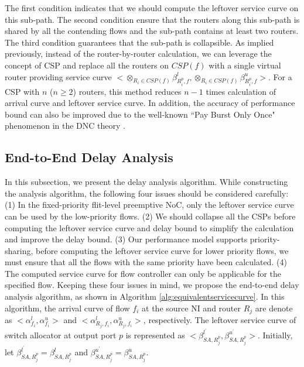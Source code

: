 \documentclass[10pt,journal]{IEEEtran}
\begin{document}
The first condition indicates that we should compute the leftover service curve on this sub-path. The second condition ensure that the routers along this sub-path is shared by all the contending flows and the sub-path contains at least two routers. The third condition guarantees that the sub-path is collapsible. As implied previously, instead of the router-by-router calculation, we can leverage the concept of CSP and replace all the routers on $CSP(f)$ with a single virtual router providing service curve $<\otimes_{R_i\in CSP(f)}\beta_{R_i^{p},f}^l,\otimes_{R_i\in CSP(f)}\beta_{R_i^{p},f}^u>$. For a CSP with $n$ ($n\geq 2$) routers, this method reduces $n-1$ times calculation of arrival curve and leftover service curve. In addition, the accuracy of performance bound can also be improved due to the well-known ``Pay Burst Only Once" phenomenon in the DNC theory \cite{Boudec2001Network}.

\subsection{End-to-End Delay Analysis}\label{e2elatency}
In this subsection, we present the delay analysis algorithm. While constructing the analysis algorithm, the following four issues should be considered carefully: (1) In the fixed-priority flit-level preemptive NoC, only the leftover service curve can be used by the low-priority flows. (2) We should collapse all the CSPs before computing the leftover service curve and delay bound to simplify the calculation and improve the delay bound. (3) Our performance model supports priority-sharing, before computing the leftover service curve for lower priority flows, we must ensure that all the flows with the same priority have been calculated. (4) The computed service curve for flow controller can only be applicable for the specified flow. Keeping these four issues in mind, we propose the end-to-end delay analysis algorithm, as shown in Algorithm \ref{alg:equivalentservicecurve}. In this algorithm, the arrival curve of flow $f_i$ at the source NI and router $R_j$ are denote as $<\alpha_{f_i}^l,\alpha_{f_i}^u>$ and $<\alpha_{R_j,f_i}^l,\alpha_{R_j,f_i}^u>$, respectively. The leftover service curve of switch allocator at output port $p$ is represented as $<\beta_{SA,R_j^{p}}^{l^\prime},\beta_{SA,R_j^{p}}^{u^\prime}>$. Initially, let $\beta_{SA,R_j^{p}}^{l^\prime}=\beta_{SA,R_j^{p}}^{l}$ and $\beta_{SA,R_j^{p}}^{u^\prime}=\beta_{SA,R_j^{p}}^{u}$.
\end{document}
